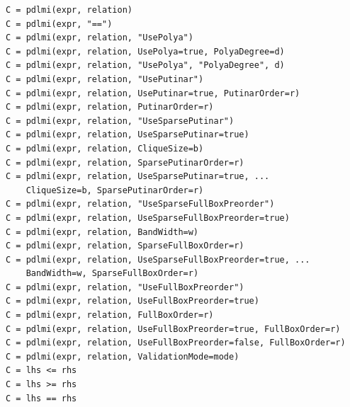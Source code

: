 \syntaxhead
\begin{lstlisting}[style=dpsyntax]
C = pdlmi(expr, relation)
C = pdlmi(expr, "==")
C = pdlmi(expr, relation, "UsePolya")
C = pdlmi(expr, relation, UsePolya=true, PolyaDegree=d)
C = pdlmi(expr, relation, "UsePolya", "PolyaDegree", d)
C = pdlmi(expr, relation, "UsePutinar")
C = pdlmi(expr, relation, UsePutinar=true, PutinarOrder=r)
C = pdlmi(expr, relation, PutinarOrder=r)
C = pdlmi(expr, relation, "UseSparsePutinar")
C = pdlmi(expr, relation, UseSparsePutinar=true)
C = pdlmi(expr, relation, CliqueSize=b)
C = pdlmi(expr, relation, SparsePutinarOrder=r)
C = pdlmi(expr, relation, UseSparsePutinar=true, ...
    CliqueSize=b, SparsePutinarOrder=r)
C = pdlmi(expr, relation, "UseSparseFullBoxPreorder")
C = pdlmi(expr, relation, UseSparseFullBoxPreorder=true)
C = pdlmi(expr, relation, BandWidth=w)
C = pdlmi(expr, relation, SparseFullBoxOrder=r)
C = pdlmi(expr, relation, UseSparseFullBoxPreorder=true, ...
    BandWidth=w, SparseFullBoxOrder=r)
C = pdlmi(expr, relation, "UseFullBoxPreorder")
C = pdlmi(expr, relation, UseFullBoxPreorder=true)
C = pdlmi(expr, relation, FullBoxOrder=r)
C = pdlmi(expr, relation, UseFullBoxPreorder=true, FullBoxOrder=r)
C = pdlmi(expr, relation, UseFullBoxPreorder=false, FullBoxOrder=r)
C = pdlmi(expr, relation, ValidationMode=mode)
C = lhs <= rhs
C = lhs >= rhs
C = lhs == rhs
\end{lstlisting}
\arghead
